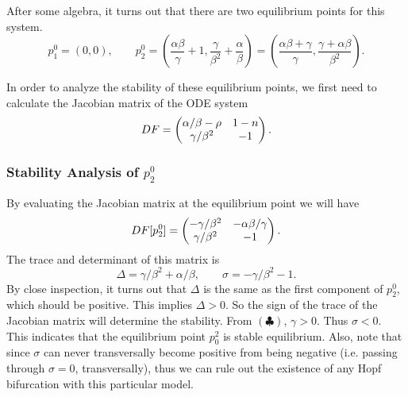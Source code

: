 After some algebra, it turns out that there are two equilibrium points for this system.
\[ p^0_1 = (0,0), \qquad p^0_2 = (\frac{\alpha\beta}{\gamma} + 1, \frac{\gamma}{\beta^2}+\frac{\alpha}{\beta}) = (\frac{\alpha\beta+\gamma}{\gamma},\frac{\gamma + \alpha\beta}{\beta^2}). \tag{E.1.1} \]
%	

In order to analyze the stability of these equilibrium points, we first need to calculate the Jacobian matrix of the ODE system 
\[ DF = \begin{pmatrix} \alpha/\beta-\rho & 1-n \\ \gamma/\beta^2 & -1 \end{pmatrix}. \]

\subsubsection{Stability Analysis of $p^0_2$}
By evaluating the Jacobian matrix at the equilibrium point we will have
\[ DF[p^0_2] = \begin{pmatrix} -\gamma/\beta^2 & -\alpha\beta/\gamma \\ \gamma/\beta^2 & -1 \end{pmatrix}. \]
The trace and determinant of this matrix is
\[  \Delta = \gamma/\beta^2 + \alpha/\beta, \qquad \sigma=-\gamma/\beta^2 - 1.  \]
By close inspection, it turns out that $\Delta$ is the same as the first component of $p^0_2$, which should be positive. This implies $\Delta > 0$. So the sign of the trace of the Jacobian matrix will determine the stability. From $(\clubsuit)$, $\gamma>0$. Thus $\sigma < 0$. This indicates that the equilibrium point $p_0^2$ is stable equilibrium. Also, note that since $\sigma$ can never transversally become positive from being negative (i.e. passing through $\sigma=0$, transversally), thus we can rule out the existence of any Hopf bifurcation with this particular model.


